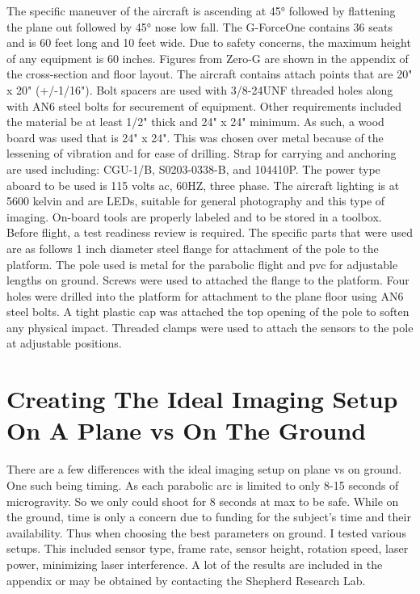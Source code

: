 The specific maneuver of the aircraft is ascending at \ang{45} followed by flattening the plane out followed by \ang{45} nose low fall. The G-ForceOne contains 36 seats and is 60 feet long and 10 feet wide. Due to safety concerns, the maximum height of any equipment is 60 inches. Figures from Zero-G are shown in the appendix of the cross-section and floor layout. The aircraft contains attach points that are 20" x 20" (+/-1/16"). Bolt spacers are used with 3/8-24UNF threaded holes along with AN6 steel bolts for securement of equipment. Other requirements included the material be at least 1/2" thick and 24" x 24" minimum. As such, a wood board was used that is 24" x 24". This was chosen over metal because of the lessening of vibration and for ease of drilling. Strap for carrying and anchoring are used including: CGU-1/B, S0203-0338-B, and 104410P. The power type aboard to be used is 115 volts ac, 60HZ, three phase. The aircraft lighting is at 5600 kelvin and are LEDs, suitable for general photography and this type of imaging. On-board tools are properly labeled and to be stored in a toolbox. Before flight, a test readiness review is required.
The specific parts that were used are as follows 1 inch diameter steel flange for attachment of the pole to the platform. The pole used is metal for the parabolic flight and pvc for adjustable lengths on ground. Screws were used to attached the flange to the platform. Four holes were drilled into the platform for attachment to the plane floor using AN6 steel bolts. A tight plastic cap was attached the top opening of the pole to soften any physical impact. Threaded clamps were used to attach the sensors to the pole at adjustable positions.

\section{Creating The Ideal Imaging Setup On A Plane vs On The Ground}
There are a few differences with the ideal imaging setup on plane vs on ground. One such being timing. As each parabolic arc is limited to only 8-15 seconds of microgravity. So we only could shoot for 8 seconds at max to be safe. While on the ground, time is only a concern due to funding for the subject's time and their availability. Thus when choosing the best parameters on ground. I tested various setups. This included sensor type, frame rate, sensor height, rotation speed, laser power, minimizing laser interference. A lot of the results are included in the appendix or may be obtained by contacting the Shepherd Research Lab.
